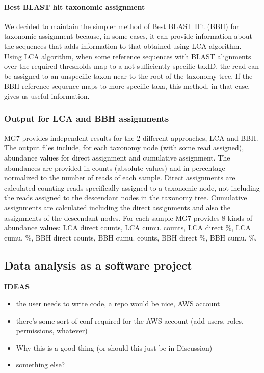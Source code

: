 \documentclass{frontiersSCNS} %
\providecommand{\tightlist}{%
\setlength{\itemsep}{0pt}\setlength{\parskip}{0pt}}
\begin{document}
\paragraph{Best BLAST hit taxonomic
assignment}\label{best-blast-hit-taxonomic-assignment}

We decided to maintain the simpler method of Best BLAST Hit (BBH) for
taxonomic assignment because, in some cases, it can provide information
about the sequences that adds information to that obtained using LCA
algorithm. Using LCA algorithm, when some reference sequences with BLAST
alignments over the required thresholds map to a not sufficiently
specific taxID, the read can be assigned to an unspecific taxon near to
the root of the taxonomy tree. If the BBH reference sequence maps to
more specific taxa, this method, in that case, gives us useful
information.

\subsubsection{Output for LCA and BBH
assignments}\label{output-for-lca-and-bbh-assignments}

MG7 provides independent results for the 2 different approaches, LCA and
BBH. The output files include, for each taxonomy node (with some read
assigned), abundance values for direct assignment and cumulative
assignment. The abundances are provided in counts (absolute values) and
in percentage normalized to the number of reads of each sample. Direct
assignments are calculated counting reads specifically assigned to a
taxonomic node, not including the reads assigned to the descendant nodes
in the taxonomy tree. Cumulative assignments are calculated including
the direct assignments and also the assignments of the descendant nodes.
For each sample MG7 provides 8 kinds of abundance values: LCA direct
counts, LCA cumu. counts, LCA direct \%, LCA cumu. \%, BBH direct
counts, BBH cumu. counts, BBH direct \%, BBH cumu. \%.

\subsection{Data analysis as a software
project}\label{data-analysis-as-a-software-project}

\textbf{IDEAS}

\begin{itemize}
\tightlist
\item
  the user needs to write code, a repo would be nice, AWS account
\item
  there's some sort of conf required for the AWS account (add users,
  roles, permissions, whatever)
\item
  Why this is a good thing (or should this just be in Discussion)
\item
  something else?
\end{itemize}
\end{document}
